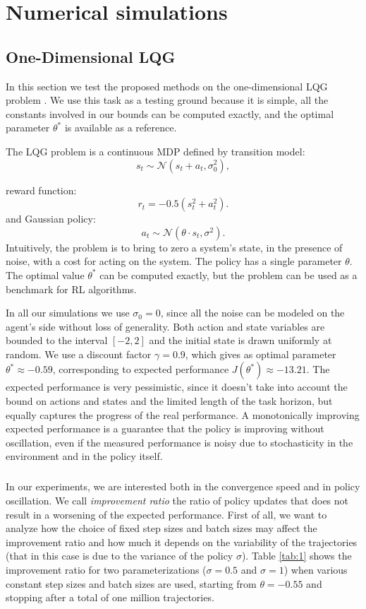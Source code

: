 \chapter{Numerical simulations}\label{sec:simul}

\section{One-Dimensional LQG}
In this section we test the proposed methods on the one-dimensional \ac{LQG} problem \cite{4867}. We use this task as a testing ground because it is simple, all the constants involved in our bounds can be computed exactly, and the optimal parameter $\theta^*$ is available as a reference.

The LQG problem is a continuous \ac{MDP} defined by transition model:
\[
	s_t \sim \mathcal{N}(s_t+a_t,\sigma_0^2),
\] 

reward function:
\[
	r_t=-0.5(s_t^2+a_t^2).
\]
and Gaussian policy:
\[
	a_t \sim \mathcal{N}(\theta\cdot s_t,\sigma^2).
\]
Intuitively, the problem is to bring to zero a system's state, in the presence of noise, with a cost for acting on the system.
The policy has a single parameter $\theta$. The optimal value $\theta^*$ can be computed exactly, but the problem can be used as a benchmark for \ac{RL} algorithms.

In all our simulations we use $\sigma_0 = 0$, since all the noise can be modeled on the agent's side without loss of generality. Both action and state variables are bounded to the interval $[-2,2]$ and the initial state is drawn uniformly at random.  
We use a discount factor $\gamma=0.9$, which gives as optimal parameter $\theta^* \approx -0.59$, corresponding to expected performance $J(\theta^*) \approx -13.21$. The expected performance is very pessimistic, since it doesn't take into account the bound on actions and states and the limited length of the task horizon, but equally captures the progress of the real performance. A monotonically improving expected performance is a guarantee that the policy is improving without oscillation, even if the measured performance is noisy due to stochasticity in the environment and in the policy itself.
\paragraph{}
In our experiments, we are interested both in the convergence speed and in policy oscillation. We call \textit{improvement ratio} the ratio of policy updates that does not result in a worsening of the expected performance. First of all, we want to analyze how the choice of fixed step sizes and batch sizes may affect the improvement ratio and how much it depends on the variability of the trajectories (that in this case is due to the variance of the policy $\sigma$).
Table \ref{tab:1} shows the improvement ratio for two parameterizations ($\sigma=0.5$ and $\sigma=1$) when various constant step sizes and batch sizes are used, starting from $\theta=-0.55$ and stopping after a total of one million trajectories. 

